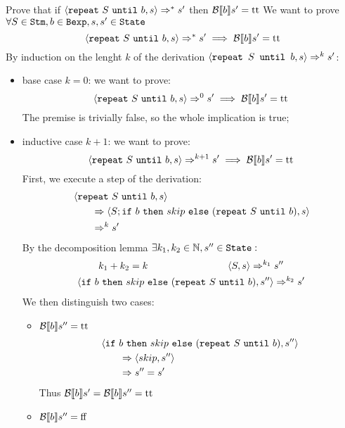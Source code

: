 \begin{exercise}{
    Prove that if $\left<\texttt{repeat}\ S\ \texttt{until}\ b, s\right> \Rightarrow^* s'$ then $\mathcal{B} \llbracket b \rrbracket s' = \text{tt}$ \vspace*{0.4cm}
}
    We want to prove $\forall S \in \texttt{Stm}, b \in \texttt{Bexp}, s, s' \in \texttt{State}$
    \[ \left<\texttt{repeat}\ S\ \texttt{until}\ b, s\right> \Rightarrow^* s' \implies \mathcal{B} \llbracket b \rrbracket s' = \text{tt} \]
    By induction on the lenght $k$ of the derivation $\left<\texttt{repeat } S \texttt{ until } b, s\right> \Rightarrow^k s'$:
    \begin{itemize}
        \item base case $k=0$: we want to prove:
            \[ \left<\texttt{repeat}\ S\ \texttt{until}\ b, s\right> \Rightarrow^0 s' \implies \mathcal{B} \llbracket b \rrbracket s' = \text{tt} \]
            The premise is trivially false, so the whole implication is true;
        \item inductive case $k+1$: we want to prove:
            \[ \left<\texttt{repeat}\ S\ \texttt{until}\ b, s\right> \Rightarrow^{k+1} s' \implies \mathcal{B} \llbracket b \rrbracket s' = \text{tt} \]
            First, we execute a step of the derivation:
            \begin{align*}
                &\left<\texttt{repeat}\ S\ \texttt{until}\ b, s\right>
                \\&\qquad \Rightarrow \left<S; \texttt{if}\ b\ \texttt{then}\ skip\ \texttt{else}\ (\texttt{repeat}\ S\ \texttt{until}\ b), s\right>
                \\&\qquad \Rightarrow^k s'
            \end{align*}
            By the decomposition lemma $\exists k_1, k_2 \in \mathbb{N}, s'' \in \texttt{State} :$
            \begin{gather*}
                k_1 + k_2 = k \qquad\qquad\qquad\qquad
                \left<S, s\right> \Rightarrow^{k_1} s'' \\
                \left<\texttt{if}\ b\ \texttt{then}\ skip\ \texttt{else}\ (\texttt{repeat}\ S\ \texttt{until}\ b), s''\right> \Rightarrow^{k_2} s'
            \end{gather*}
            We then distinguish two cases:
            \begin{itemize}
                \item $\mathcal{B} \llbracket b \rrbracket s'' = \text{tt}$
                    \begin{align*}
                        &\left<\texttt{if}\ b\ \texttt{then}\ skip\ \texttt{else}\ (\texttt{repeat}\ S\ \texttt{until}\ b), s''\right>
                        \\&\qquad \Rightarrow \left<skip, s''\right>
                        \\&\qquad \Rightarrow s'' = s'
                    \end{align*}
                    Thus $\mathcal{B} \llbracket b \rrbracket s' = \mathcal{B} \llbracket b \rrbracket s'' = \text{tt}$
                \item $\mathcal{B} \llbracket b \rrbracket s'' = \text{ff}$

\end{itemize}
\end{itemize}
\end{exercise}
